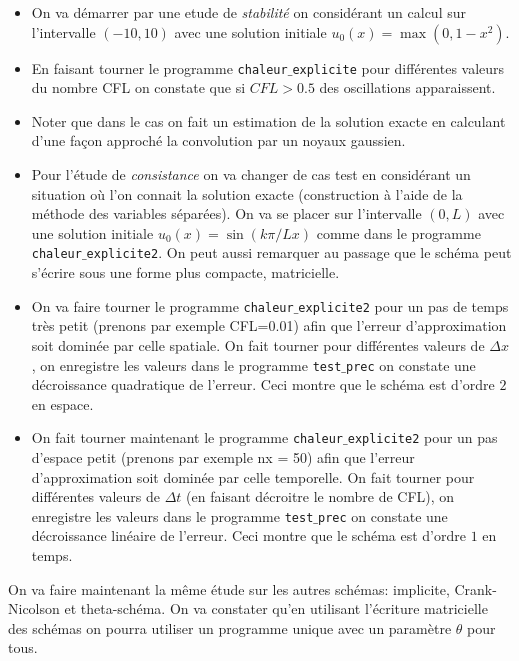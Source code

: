 \documentclass[12pt,a4paper]{article}
\begin{document}
\begin{itemize}
\item On va démarrer par une etude de {\it stabilité} on considérant un calcul sur l'intervalle $(-10,10)$ avec une solution initiale $u_0(x)=\max(0,1-x^2)$. 

\item En faisant tourner le programme \texttt{chaleur$\_$explicite} pour différentes valeurs du nombre CFL on constate que si $CFL>0.5$ des oscillations apparaissent. 

\item Noter que dans le cas on fait un estimation de la solution exacte en calculant d'une façon approché la convolution par un noyaux gaussien.

%

\item Pour l'étude de {\it consistance} on va changer de cas test en considérant un situation où l'on connait la solution exacte (construction à l'aide de la méthode des variables séparées).  On va se placer sur l'intervalle $(0,L)$ avec une solution initiale $u_0(x)=\sin(k\pi/L x)$ comme dans le programme \texttt{chaleur$\_$explicite2}. On peut aussi remarquer au passage que le schéma peut s'écrire sous une forme plus compacte, matricielle.

\item On va faire tourner le programme \texttt{chaleur$\_$explicite2} pour un pas de temps très petit (prenons par exemple CFL=0.01) afin que l'erreur d'approximation soit dominée par celle spatiale. On fait tourner pour différentes valeurs de $\Delta x$, on enregistre les valeurs dans le programme \texttt{test$\_$prec} on constate une décroissance quadratique de l'erreur. Ceci montre que le schéma est d'ordre $2$ en espace.

\item On fait tourner maintenant le programme \texttt{chaleur$\_$explicite2} pour un pas d'espace petit (prenons par exemple nx = 50) afin que l'erreur d'approximation soit dominée par celle temporelle. On fait tourner pour différentes valeurs de $\Delta t$ (en faisant décroitre le nombre de CFL), on enregistre les valeurs dans le programme \texttt{test$\_$prec} on constate une décroissance linéaire de l'erreur. Ceci montre que le schéma est d'ordre $1$ en temps.

\end{itemize}

On va faire maintenant la même étude sur les autres schémas: implicite, Crank-Nicolson et theta-schéma. On va constater qu'en utilisant l'écriture matricielle des schémas on pourra utiliser un programme unique avec un paramètre $\theta$ pour tous. 
\end{document}

